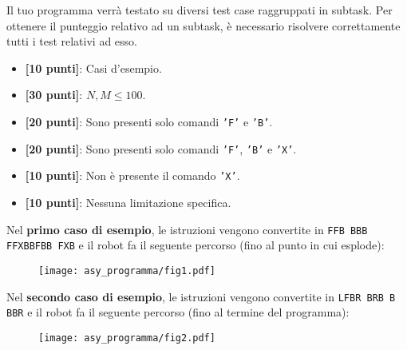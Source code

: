 \Scoring
Il tuo programma verrà testato su diversi test case raggruppati in subtask.
Per ottenere il punteggio relativo ad un subtask, è necessario risolvere
correttamente tutti i test relativi ad esso.

\begin{itemize}[nolistsep,itemsep=2mm]
  \item \textbf{ [10 punti]}: Casi d'esempio.
  \item \textbf{ [30 punti]}: $N, M \le 100$.
  \item \textbf{ [20 punti]}: Sono presenti solo comandi \texttt{'F'} e \texttt{'B'}.
  \item \textbf{ [20 punti]}: Sono presenti solo comandi \texttt{'F'}, \texttt{'B'} e \texttt{'X'}.
  \item \textbf{ [10 punti]}: Non \`e presente il comando \texttt{'X'}.
  \item \textbf{ [10 punti]}: Nessuna limitazione specifica.
\end{itemize}



\Examples
\begin{example}
%
%
\end{example}


\Explanation
Nel \textbf{primo caso di esempio}, le istruzioni vengono convertite in \texttt{FFB BBB FFXBBFBB FXB} e il robot fa il seguente percorso (fino al punto in cui esplode):
\begin{figure}[H]%
\centering\texttt{[image: asy\_programma/fig1.pdf]}%
\end{figure}

Nel \textbf{secondo caso di esempio}, le istruzioni vengono convertite in \texttt{LFBR BRB B BBR} e il robot fa il seguente percorso (fino al termine del programma):
\begin{figure}[H]%
\centering\texttt{[image: asy\_programma/fig2.pdf]}%
\end{figure}
